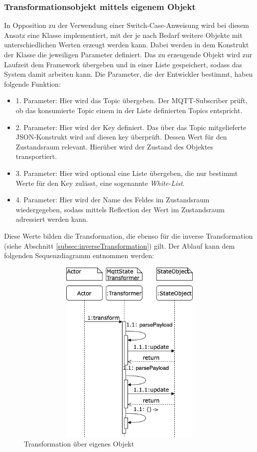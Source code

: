     \subsubsection*{Transformationsobjekt mittels eigenem Objekt}
        In Opposition zu der Verwendung einer Switch-Case-Anweisung wird bei diesem Ansatz eine Klasse implementiert, mit der je nach Bedarf 
        weitere Objekte mit unterschiedlichen Werten erzeugt werden kann. Dabei werden in dem Konstrukt der Klasse die jeweiligen Parameter 
        definiert. Das zu erzeugende Objekt wird zur Laufzeit dem Framework übergeben und in einer Liste gespeichert, sodass das System damit arbeiten kann. 
        Die Parameter, die der Entwickler bestimmt, haben folgende Funktion:
        \begin{itemize}
            \item 1. Parameter: Hier wird das Topic übergeben. Der \acs{MQTT}-Subscriber prüft, ob das konsumierte Topic einem in der Liste definierten Topics entspricht.
            \item 2. Parameter: Hier wird der Key definiert. Das über das Topic mitgelieferte JSON-Konstrukt wird auf diesen key überprüft. Dessen Wert für den Zustandsraum relevant. Hierüber wird der Zustand des Objektes transportiert.
            \item 3. Parameter: Hier wird optional eine Liste übergeben, die nur bestimmt Werte für den Key zulässt, eine sogenannte \textit{White-List}.
            \item 4. Parameter: Hier wird der Name des Feldes im Zustandsraum wiedergegeben, sodass mittels Reflection der Wert im Zustandsraum adressiert werden kann.
        \end{itemize}
        Diese Werte bilden die Transformation, die ebenso für die inverse Transformation (siehe Abschnitt \ref{subsec:inverseTransformation}) gilt.
        Der Ablauf kann dem folgenden Sequenzdiagramm entnommen werden:
        \\
        \pagebreak
    \begin{figure}[hbt!]
        \centering
        \includegraphics[width=14cm,height=9cm,keepaspectratio]{images/Transformation_new.drawio.png}
        \caption{Transformation über eigenes Objekt}
        \label{fig:sequenceTransformationNew}
    \end{figure}
